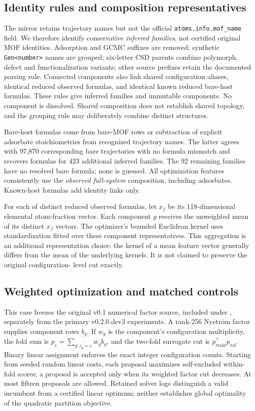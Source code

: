 \subsection{Identity rules and composition representatives}

The mirror retains trajectory names but not the official
\texttt{atoms.info.mof\_name} field. We therefore identify conservative
\emph{inferred families}, not certified original MOF identities. Adsorption and
GCMC suffixes are removed; synthetic \texttt{Gen<number>} names are grouped;
six-letter CSD parents combine polymorph, defect and functionalization variants;
other source prefixes retain the documented parsing rule. Connected components
also link shared configuration aliases, identical reduced observed formulas,
and identical known reduced bare-host formulas. These rules give
\ODACFamilies{} inferred families and \ODACGroups{} immutable components.
No component is dissolved. Shared composition does not establish shared
topology, and the grouping rule may deliberately combine distinct structures.

Bare-host formulas come from bare-MOF rows or subtraction of explicit
adsorbate stoichiometries from recognized trajectory names. The latter agrees
with 97,870 corresponding bare trajectories with no formula mismatch and
recovers formulas for 423 additional inferred families. The 92 remaining
families have no resolved bare formula; none is guessed. All optimization
features consistently use the \emph{observed full-system} composition,
including adsorbates. Known-host formulas add identity links only.

For each of \ODACFormulas{} distinct reduced observed formulas, let $x_f$
be its 118-dimensional elemental atom-fraction vector. Each component $g$
receives the unweighted mean of its distinct $x_f$ vectors. The optimizer's
bounded Euclidean kernel uses standardization fitted over these component
representatives. This aggregation is an additional representation choice:
the kernel of a mean feature vector generally differs from the mean of the
underlying kernels. It is not claimed to preserve the original configuration-
level cut exactly.

\subsection{Weighted optimization and matched controls}

This case freezes the original v0.1 numerical factor source, included under
, separately from the primary v0.2.0.dev3
experiments. A rank-256 Nystr\"om factor supplies component rows $b_g$.
If $w_g$ is the component's configuration multiplicity, the fold sum is
$p_c=\sum_{g:z_g=c}w_gb_g$, and the two-fold surrogate cut is
$p_{\mathrm{train}}^\top p_{\mathrm{val}}$. Binary linear assignment enforces
the exact integer configuration counts. Starting from seeded random linear
costs, each proposal maximizes self-excluded within-fold scores; a proposal is
accepted only when its weighted factor cut decreases. At most fifteen
proposals are allowed. Retained solver logs distinguish a valid incumbent
from a certified linear optimum; neither establishes global optimality of the
quadratic partition objective.

